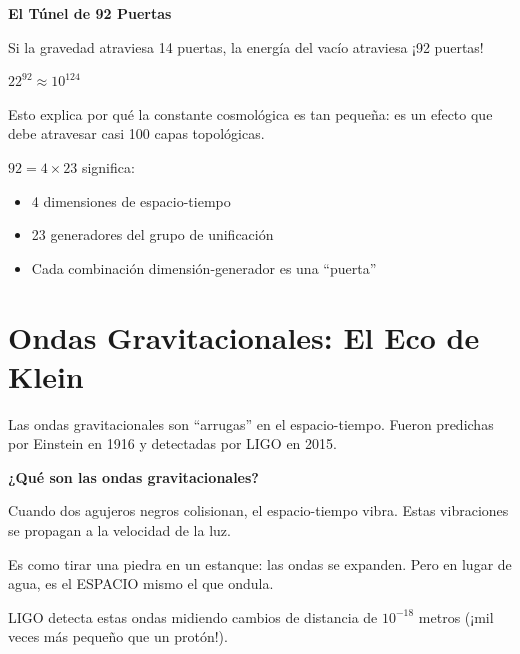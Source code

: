 \begin{analogiabox}
\textbf{El Túnel de 92 Puertas}

Si la gravedad atraviesa 14 puertas, la energía del vacío
atraviesa ¡92 puertas!

$22^{92} \approx 10^{124}$

Esto explica por qué la constante cosmológica es tan pequeña:
es un efecto que debe atravesar casi 100 capas topológicas.

$92 = 4 \times 23$ significa:
\begin{itemize}
    \item 4 dimensiones de espacio-tiempo
    \item 23 generadores del grupo de unificación
    \item Cada combinación dimensión-generador es una ``puerta''
\end{itemize}
\end{analogiabox}


\section{Ondas Gravitacionales: El Eco de Klein}

Las ondas gravitacionales son ``arrugas'' en el espacio-tiempo.
Fueron predichas por Einstein en 1916 y detectadas por LIGO en 2015.

\begin{nivelconceptual}
\textbf{¿Qué son las ondas gravitacionales?}

Cuando dos agujeros negros colisionan, el espacio-tiempo vibra.
Estas vibraciones se propagan a la velocidad de la luz.

Es como tirar una piedra en un estanque: las ondas se expanden.
Pero en lugar de agua, es el ESPACIO mismo el que ondula.

LIGO detecta estas ondas midiendo cambios de distancia
de $10^{-18}$ metros (¡mil veces más pequeño que un protón!).
\end{nivelconceptual}

